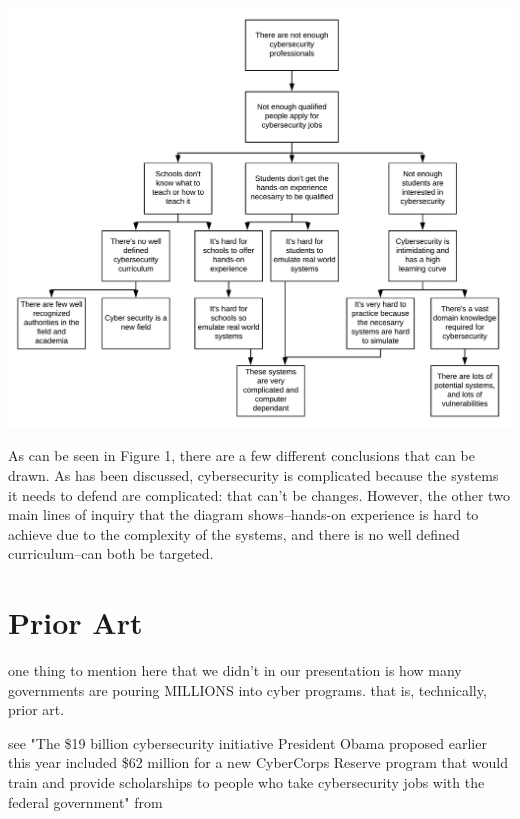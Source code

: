 \documentclass[openright]{report}
\begin{document}
\begin{center}
    \includegraphics[scale=0.34]{images/Why-Why.png}
\end{center}

\par As can be seen in Figure 1, there are a few different conclusions that can be drawn. As has been discussed, cybersecurity is complicated because the systems it needs to defend are complicated: that can't be changes. However, the other two main lines of inquiry that the diagram shows--hands-on experience is hard to achieve due to the complexity of the systems, and there is no well defined curriculum--can both be targeted.

\section{Prior Art}

\par one thing to mention here that we didn't in our presentation is how many governments are pouring MILLIONS into cyber programs. that is, technically, prior art.

\par see "The \$19 billion cybersecurity initiative President Obama proposed earlier this year included \$62 million for a new CyberCorps Reserve program that would train and provide scholarships to people who take cybersecurity jobs with the federal government" from \cite{why_no_cyber_classes}
\end{document}
